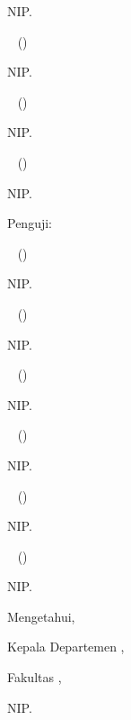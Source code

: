 \begin{center}
\begin{enumerate}
{{                        NIP. ~\NIP@pbb@dua
                    }
            }
            {
                \item \pbb@satu ~ \hfill (\fillin[3cm])

                NIP. ~\NIP@pbb@satu
                \item \pbb@dua ~ \hfill (\fillin[3cm])

                NIP. ~\NIP@pbb@dua
                \item \pbb@tiga ~ \hfill (\fillin[3cm])

                NIP. ~\NIP@pbb@tiga
            }
    \end{enumerate}

    \vspace{0.5cm}
    Penguji:
    \begin{enumerate}
        \ifthenelse{\equal{\uji@tiga}{}\OR\equal{\uji@tiga}{ }}
            {
                \ifthenelse{\equal{\uji@dua}{}\OR\equal{\uji@dua}{ }}
                    {
                        \item \uji@satu ~ \hfill (\fillin[3cm])

                        NIP. ~\NIP@uji@satu
                    }
                    {
                        \item \uji@satu ~ \hfill (\fillin[3cm])

                        NIP. ~\NIP@uji@satu
                        \item \uji@dua ~ \hfill (\fillin[3cm])

                        NIP. ~\NIP@uji@dua
                    }
            }
            {
                \item \uji@satu ~ \hfill (\fillin[3cm])

                NIP. ~\NIP@uji@satu
                \item \uji@dua ~ \hfill (\fillin[3cm])

                NIP. ~\NIP@uji@dua
                \item \uji@tiga ~ \hfill (\fillin[3cm])

                NIP. ~\NIP@uji@tiga
            }
    \end{enumerate}

    \begin{flushright}
        \begin{minipage}{.4\textwidth}
            \begin{center}
                Mengetahui,

                Kepala Departemen \@departemen,

                Fakultas \@fakultas,

                \vspace{2cm}
                \underline{\@kadep}

                NIP. \NIP@kadep
            \end{center}
        \end{minipage}
    \end{flushright}
\end{center}
\makeatother
